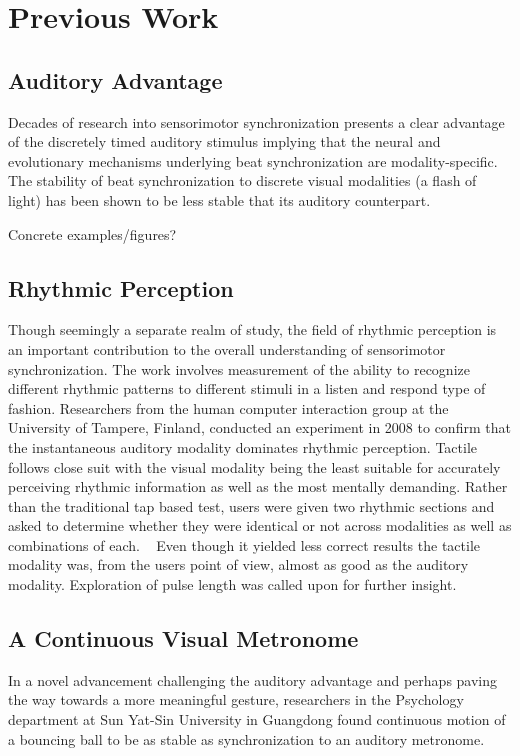 \chapter{Previous Work}

\section{Auditory Advantage}
Decades of research into sensorimotor synchronization presents a clear advantage of the discretely timed auditory stimulus implying that the neural and evolutionary mechanisms underlying beat synchronization are modality-specific.
~\cite{gan2015synchronization} The stability of beat synchronization to discrete visual modalities (a flash of light) has been shown to be less stable that its auditory counterpart.

Concrete examples/figures?

\section{Rhythmic Perception}
Though seemingly a separate realm of study, the field of rhythmic perception is an important contribution to the overall understanding of sensorimotor synchronization. The work involves measurement of the ability to recognize different rhythmic patterns to different stimuli in a listen and respond type of fashion. Researchers from the human computer interaction group at the University of Tampere, Finland, conducted an experiment in 2008 to confirm that the instantaneous auditory modality dominates rhythmic perception. Tactile follows close suit with the visual modality being the least suitable for accurately perceiving rhythmic information as well as the most mentally demanding. Rather than the traditional tap based test, users were given two rhythmic sections and asked to determine whether they were identical or not across modalities as well as combinations of each. ~\cite{jokiniemi2008crossmodal} Even though it yielded less correct results the tactile modality was, from the users point of view, almost as good as the auditory modality. Exploration of pulse length was called upon for further insight.

\section{A Continuous Visual Metronome} \label{visualMet}
In a novel advancement challenging the auditory advantage and perhaps paving the way towards a more meaningful gesture, researchers in the Psychology department at Sun Yat-Sin University in Guangdong found continuous motion of a bouncing ball to be as stable as synchronization to an auditory metronome.
~\cite{gan2015synchronization}


